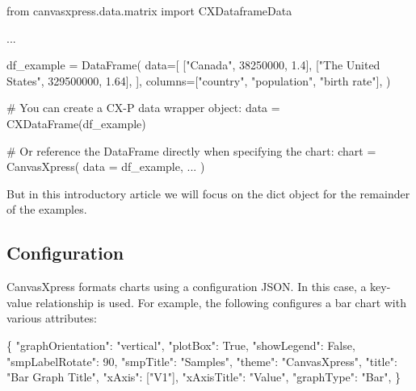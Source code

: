 \documentclass[
  letterpaper,
  DIV=11,
  numbers=noendperiod]{scrartcl}
\newenvironment{Shaded}{\begin{snugshade}}{\end{snugshade}}
\newcommand{\CommentTok}[1]{\textcolor[rgb]{0.37,0.37,0.37}{#1}}
\newcommand{\DecValTok}[1]{\textcolor[rgb]{0.68,0.00,0.00}{#1}}
\newcommand{\FloatTok}[1]{\textcolor[rgb]{0.68,0.00,0.00}{#1}}
\newcommand{\ImportTok}[1]{\textcolor[rgb]{0.00,0.46,0.62}{#1}}
\newcommand{\NormalTok}[1]{\textcolor[rgb]{0.00,0.23,0.31}{#1}}
\newcommand{\OperatorTok}[1]{\textcolor[rgb]{0.37,0.37,0.37}{#1}}
\newcommand{\StringTok}[1]{\textcolor[rgb]{0.13,0.47,0.30}{#1}}
\newcommand{\VariableTok}[1]{\textcolor[rgb]{0.07,0.07,0.07}{#1}}
\begin{document}
\begin{Shaded}
\begin{Highlighting}[]
\ImportTok{from}\NormalTok{ canvasxpress.data.matrix }\ImportTok{import}\NormalTok{ CXDataframeData}

\NormalTok{...}

\NormalTok{df\_example }\OperatorTok{=}\NormalTok{ DataFrame(}
\NormalTok{  data}\OperatorTok{=}\NormalTok{[}
\NormalTok{    [}\StringTok{"Canada"}\NormalTok{, }\DecValTok{38250000}\NormalTok{, }\FloatTok{1.4}\NormalTok{],}
\NormalTok{    [}\StringTok{"The United States"}\NormalTok{, }\DecValTok{329500000}\NormalTok{, }\FloatTok{1.64}\NormalTok{],}
\NormalTok{  ],}
\NormalTok{  columns}\OperatorTok{=}\NormalTok{[}\StringTok{"country"}\NormalTok{, }\StringTok{"population"}\NormalTok{, }\StringTok{"birth rate"}\NormalTok{],}
\NormalTok{)}

\CommentTok{\# You can create a CX{-}P data wrapper object:}
\NormalTok{data }\OperatorTok{=}\NormalTok{ CXDataFrame(df\_example)}

\CommentTok{\# Or reference the DataFrame directly when specifying the chart:}
\NormalTok{chart }\OperatorTok{=}\NormalTok{ CanvasXpress(}
\NormalTok{    data }\OperatorTok{=}\NormalTok{ df\_example,}
\NormalTok{    ...}
\NormalTok{)}
\end{Highlighting}
\end{Shaded}

But in this introductory article we will focus on the dict object for
the remainder of the examples.

\hypertarget{configuration}{%
\subsection{Configuration}\label{configuration}}

CanvasXpress formats charts using a configuration JSON. In this case, a
key-value relationship is used. For example, the following configures a
bar chart with various attributes:

\begin{Shaded}
\begin{Highlighting}[]
\NormalTok{\{}
    \StringTok{"graphOrientation"}\NormalTok{: }\StringTok{"vertical"}\NormalTok{,}
    \StringTok{"plotBox"}\NormalTok{: }\VariableTok{True}\NormalTok{,}
    \StringTok{"showLegend"}\NormalTok{: }\VariableTok{False}\NormalTok{,}
    \StringTok{"smpLabelRotate"}\NormalTok{: }\DecValTok{90}\NormalTok{,}
    \StringTok{"smpTitle"}\NormalTok{: }\StringTok{"Samples"}\NormalTok{,}
    \StringTok{"theme"}\NormalTok{: }\StringTok{"CanvasXpress"}\NormalTok{,}
    \StringTok{"title"}\NormalTok{: }\StringTok{"Bar Graph Title"}\NormalTok{,}
    \StringTok{"xAxis"}\NormalTok{: [}\StringTok{"V1"}\NormalTok{],}
    \StringTok{"xAxisTitle"}\NormalTok{: }\StringTok{"Value"}\NormalTok{,}
    \StringTok{"graphType"}\NormalTok{: }\StringTok{"Bar"}\NormalTok{,}
\NormalTok{\}}
\end{Highlighting}
\end{Shaded}
\end{document}
